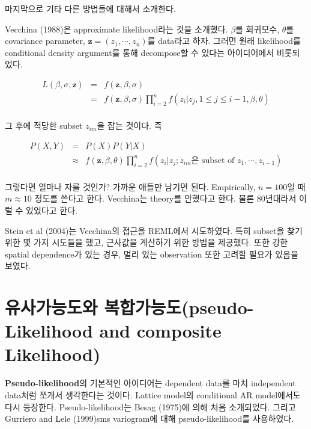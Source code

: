 \documentclass[b5paper,]{scrbook}
\theoremstyle{plain}
\theoremstyle{definition}
\numberwithin{equation}{section}
\begin{document}
마지막으로 기타 다른 방법들에 대해서 소개한다.

Vecchina (1988)은 approximate likelihood라는 것을 소개했다. \(\beta\)를 회귀모수, \(\theta\)를 covariance parameter, \(\mathbf{z}=(z_{1}, \cdots , z_{n})\)를 data라고 하자. 그러면 원래 likelihood를 conditional density argument를 통해 decompose할 수 있다는 아이디어에서 비롯되었다.

\begin{eqnarray*}
L(\beta, \sigma, \mathbf{z}) &=& f(\mathbf{z}, \beta, \sigma)\\
&=&f(\mathbf{z}, \beta, \sigma) \prod_{i=2}^{n}f(z_{i}|z_{j}, 1 \leq j \leq i-1, \beta, \theta)\\
\end{eqnarray*}

그 후에 적당한 subset \(z_{im}\)을 잡는 것이다. 즉

\begin{eqnarray*}
P(X,Y)&=&P(X)P(Y|X)\\
&\approx& f(\mathbf{z},\beta, \theta)\prod_{i=2}^{n}f(z_{i}|z_{j}; z_{im}\text{은 subset of }z_{1}, \cdots ,z_{i-1})\\
\end{eqnarray*}

그렇다면 얼마나 자를 것인가? 가까운 애들만 남기면 된다. Empirically, \(n=100\)일 때 \(m \approx 10\) 정도를 쓴다고 한다. Vecchina는 theory를 안했다고 한다. 물론 80년대라서 이럴 수 있었다고 한다.

Stein et al (2004)는 Vecchina의 접근을 REML에서 시도하였다. 특히 subset을 찾기 위한 몇 가지 시도들을 했고, 근사값을 계산하기 위한 방법을 제공했다. 또한 강한 spatial dependence가 있는 경우, 멀리 있는 observation 또한 고려할 필요가 있음을 보였다.

\hypertarget{-pseudo-likelihood-and-composite-likelihood}{%
\section{유사가능도와 복합가능도(pseudo-Likelihood and composite Likelihood)}\label{-pseudo-likelihood-and-composite-likelihood}}

\textbf{Pseudo-likelihood}의 기본적인 아이디어는 dependent data를 마치 independent data처럼 쪼개서 생각한다는 것이다. Lattice model의 conditional AR model에서도 다시 등장한다. Pseudo-likelihood는 Besag (1975)에 의해 처음 소개되었다. 그리고 Gurriero and Lele (1999)sms variogram에 대해 pseudo-likelihood를 사용하였다.
\end{document}
